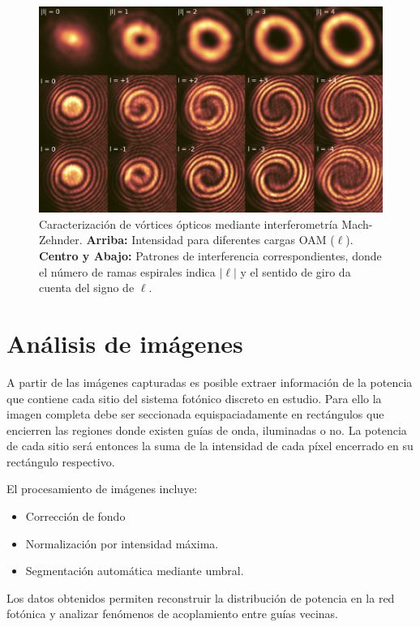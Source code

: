 \begin{figure}[H]
	\centering
	\includegraphics[width=0.95\linewidth]{media/OAM-free.png}
	\caption[Caracterización de vórtices ópticos mediante interferometría Mach-Zehnder.]{Caracterización de vórtices ópticos mediante interferometría Mach-Zehnder. \textbf{Arriba:} Intensidad para diferentes cargas OAM ($\ell$). \textbf{Centro y Abajo:} Patrones de interferencia correspondientes, donde el número de ramas espirales indica $|\ell|$ y el sentido de giro da cuenta del signo de $\ell$.}
	\label{fig:OAM}
\end{figure}
\section{Análisis de imágenes \label{sec:analimag}}
A partir de las imágenes capturadas es posible extraer información de la potencia que contiene cada sitio del sistema fotónico discreto en estudio. Para ello la imagen completa debe ser seccionada equispaciadamente en rectángulos que encierren las regiones donde existen guías de onda, iluminadas o no. La potencia de cada sitio será entonces la suma de la intensidad de cada píxel encerrado en su rectángulo respectivo.

El procesamiento de imágenes incluye:
\begin{itemize}
    \item Corrección de fondo
    \item Normalización por intensidad máxima.
    \item Segmentación automática mediante umbral.
\end{itemize}

Los datos obtenidos permiten reconstruir la distribución de potencia en la red fotónica y analizar fenómenos de acoplamiento entre guías vecinas.